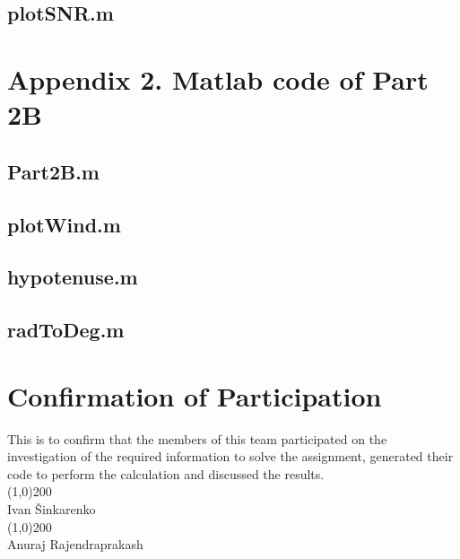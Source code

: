 \documentclass{article}
\def\authorivan{Ivan \v Sinkarenko}
\def\authoranu{Anuraj Rajendraprakash}
\begin{document}
\subsection{plotSNR.m}


\newpage
\section{Appendix 2. Matlab code of Part 2B}

\subsection{Part2B.m}


\subsection{plotWind.m}


\subsection{hypotenuse.m}


\subsection{radToDeg.m}


\newpage
\section{Confirmation of Participation}

This is to confirm that the members of this team participated on the investigation of the required information to solve the assignment, generated their code to perform the calculation and discussed the results.\\
\vspace{2cm}
\newline
\line(1,0){200}\\
\authorivan\\
\vspace{2cm}
\newline
\line(1,0){200}\\
\authoranu\\
\end{document}

